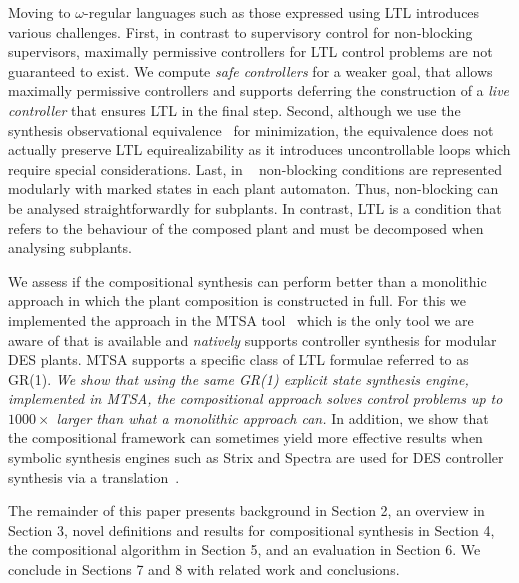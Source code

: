 Moving to $\omega$-regular languages such as those expressed using LTL introduces various challenges. 
First, in contrast to supervisory control for non-blocking supervisors, maximally permissive controllers for LTL control problems are not guaranteed to exist. We compute \textit{safe controllers} for a weaker goal, that allows maximally permissive controllers and supports deferring the construction of a \textit{live controller} that ensures LTL in the final step. Second, although we use the synthesis observational equivalence~\cite{mohajerani_framework_2014} for minimization, the equivalence does not actually preserve LTL equirealizability as it introduces uncontrollable loops which require special considerations. 
Last, in ~\cite{mohajerani_framework_2014} non-blocking conditions are represented modularly with marked states in each plant automaton. Thus, non-blocking can be analysed straightforwardly for subplants. In contrast, LTL is a condition that refers to the behaviour of the composed plant and must be decomposed when analysing subplants. 

We assess if the compositional synthesis can perform better than a monolithic approach in which the plant composition is constructed in full. 
For this we implemented the approach in the MTSA tool~\cite{MTSATool} which is the only tool we are aware of that is available and \textit{natively} supports controller synthesis for modular DES plants. MTSA supports a specific class of LTL formulae referred to as GR(1)\cite{Piterman:2006:SRD}.
\textit{We show that using the same GR(1) explicit state synthesis engine, implemented in MTSA, the compositional approach solves control
problems up to $1000\times$ larger than what a monolithic approach can.} In addition, we show that the compositional framework can sometimes yield more effective results when symbolic synthesis engines such as Strix\cite{meyer_strix_2018} and Spectra\cite{maoz2021spectra} are used for DES controller synthesis via a translation~\cite{majumdar_environmentally-friendly_2019}. 

The remainder of this paper presents background in Section 2, an overview in Section 3, novel definitions and results for compositional synthesis in Section 4, the compositional algorithm in Section 5, and an evaluation in Section 6. We conclude in Sections 7 and 8 with related work and conclusions. 




